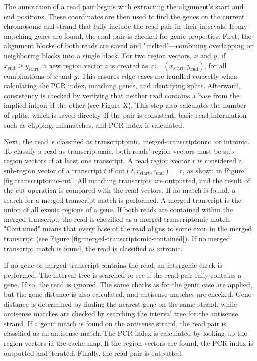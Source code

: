 \documentclass{article}
\begin{document}
    The annotation of a read pair begins with extracting the alignment's start and end positions. These coordinates are then used to find the genes on the current chromosome and strand that fully include the read pair in their intervals. If any matching genes are found, the read pair is checked for genic properties. First, the alignment blocks of both reads are saved and "melted"—combining overlapping or neighboring blocks into a single block. For two region vectors, \(x\) and \(y\), if \(x_{\text{end}} \geq y_{\text{start}}\), a new region vector \(z\) is created as \(z \coloneqq (x_{\text{start}}, y_{\text{end}})\), for all combinations of \(x\) and \(y\). This ensures edge cases are handled correctly when calculating the PCR index, matching genes, and identifying splits. Afterward, consistency is checked by verifying that neither read contains a base from the implied intron of the other (see Figure X). This step also calculates the number of splits, which is saved directly. If the pair is consistent, basic read information such as clipping, mismatches, and PCR index is calculated.


    Next, the read is classified as transcriptomic, merged-transcriptomic, or intronic. To classify a read as transcriptomic, both reads' region vectors must be sub-region vectors of at least one transcript. A read region vector \(r\) is considered a sub-region vector of a transcript \(t\) if \(\text{cut}(t, r_{\text{start}}, r_{\text{end}}) = r\), as shown in Figure \ref{fig:transcriptomic-cut}. All matching transcripts are outputted, and the result of the cut operation is compared with the read vectors. If no match is found, a search for a merged transcript match is performed. A merged transcript is the union of all exonic regions of a gene. If both reads are contained within the merged transcript, the read is classified as a merged transcriptomic match. "Contained" means that every base of the read aligns to some exon in the merged transcript (see Figure \ref{fig:merged-transcriptomic-contained}). If no merged transcript match is found, the read is classified as intronic.


    If no gene or merged transcript contains the read, an intergenic check is performed. The interval tree is searched to see if the read pair fully contains a gene. If so, the read is ignored. The same checks as for the genic case are applied, but the gene distance is also calculated, and antisense matches are checked. Gene distance is determined by finding the nearest gene on the same strand, while antisense matches are checked by searching the interval tree for the antisense strand. If a genic match is found on the antisense strand, the read pair is classified as an antisense match. The PCR index is calculated by looking up the region vectors in the cache map. If the region vectors are found, the PCR index is outputted and iterated. Finally, the read pair is outputted.
\end{document}
